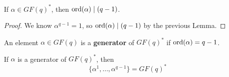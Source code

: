 \begin{thmbox}
    \begin{corollary}
        If $ \alpha\in GF(q)^* $, then $ \operatorname{ord}(\alpha)\mid (q-1) $.
    \end{corollary}
\end{thmbox}

\begin{proof}
    We know $ \alpha^{q-1}=1 $, so $ \operatorname{ord}(\alpha)\mid (q-1) $ by
    the previous Lemma.
\end{proof}

\begin{defbox}
    \begin{definition}
        An element $ \alpha\in GF(q) $ is a \textbf{generator} of
        $ GF(q)^* $ if $ \operatorname{ord}(\alpha)=q-1 $.
    \end{definition}
\end{defbox}

\begin{thmbox}
    \begin{theorem}
        If $ \alpha $ is a generator of $ GF(q)^* $, then
        \[ \{\alpha^1,\ldots ,\alpha^{q-1}\}=GF(q)^* \]
    \end{theorem}
\end{thmbox}